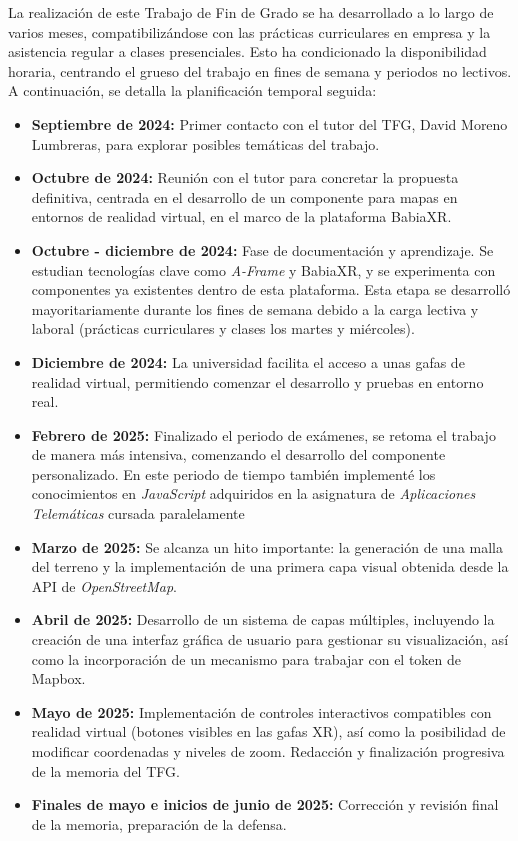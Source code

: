 \documentclass[a4paper, 12pt]{book}
\begin{document}
La realización de este Trabajo de Fin de Grado se ha desarrollado a lo largo de varios meses, compatibilizándose con las prácticas curriculares en empresa y la asistencia regular a clases presenciales. Esto ha condicionado la disponibilidad horaria, centrando el grueso del trabajo en fines de semana y periodos no lectivos. A continuación, se detalla la planificación temporal seguida:

\begin{itemize}
  \item \textbf{Septiembre de 2024:} Primer contacto con el tutor del TFG, David Moreno Lumbreras, para explorar posibles temáticas del trabajo.

  \item \textbf{Octubre de 2024:} Reunión con el tutor para concretar la propuesta definitiva, centrada en el desarrollo de un componente para mapas en entornos de realidad virtual, en el marco de la plataforma BabiaXR.

  \item \textbf{Octubre - diciembre de 2024:} Fase de documentación y aprendizaje. Se estudian tecnologías clave como \textit{A-Frame} y BabiaXR, y se experimenta con componentes ya existentes dentro de esta plataforma. Esta etapa se desarrolló mayoritariamente durante los fines de semana debido a la carga lectiva y laboral (prácticas curriculares y clases los martes y miércoles).

  \item \textbf{Diciembre de 2024:} La universidad facilita el acceso a unas gafas de realidad virtual, permitiendo comenzar el desarrollo y pruebas en entorno real.

  \item \textbf{Febrero de 2025:} Finalizado el periodo de exámenes, se retoma el trabajo de manera más intensiva, comenzando el desarrollo del componente personalizado. En este periodo de tiempo también implementé los conocimientos en \textit{JavaScript} adquiridos en la asignatura de \textit{Aplicaciones Telemáticas} cursada paralelamente

  \item \textbf{Marzo de 2025:} Se alcanza un hito importante: la generación de una malla del terreno y la implementación de una primera capa visual obtenida desde la API de \textit{OpenStreetMap}.

  \item \textbf{Abril de 2025:} Desarrollo de un sistema de capas múltiples, incluyendo la creación de una interfaz gráfica de usuario para gestionar su visualización, así como la incorporación de un mecanismo para trabajar con el token de Mapbox.

  \item \textbf{Mayo de 2025:} Implementación de controles interactivos compatibles con realidad virtual (botones visibles en las gafas XR), así como la posibilidad de modificar coordenadas y niveles de zoom. Redacción y finalización progresiva de la memoria del TFG.

  \item \textbf{Finales de mayo e inicios de junio de 2025:} Corrección y revisión final de la memoria, preparación de la defensa.
\end{itemize}
\end{document}
